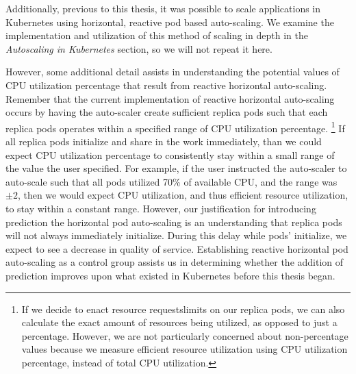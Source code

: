 Additionally, previous to this thesis, it was possible to scale applications in
Kubernetes using horizontal, reactive pod based auto-scaling. We examine the implementation
and utilization of this method of scaling in depth in the \textit{Autoscaling in
Kubernetes} section, so we will not repeat it here.

However, some additional detail assists in understanding the potential values of
CPU utilization percentage that result from reactive horizontal auto-scaling.
Remember that the current implementation of reactive horizontal auto-scaling
occurs by having the auto-scaler create sufficient replica pods such that each
replica pods operates within a specified range of CPU utilization percentage.
\footnote{If we decide to enact resource requests\/limits on our replica pods, we can also
calculate the exact amount of resources being utilized, as opposed to just a
percentage. However, we are not particularly concerned about non-percentage
values because we measure efficient resource utilization using CPU utilization
percentage, instead of total CPU utilization.} If all replica pods initialize
and share in the work immediately, than we could expect CPU utilization
percentage to consistently stay within a small range of the value the user
specified. For example, if the user instructed the auto-scaler to auto-scale
such that all pods utilized 70\% of available CPU, and the range was $\pm 2$,
then we would expect CPU utilization, and thus efficient resource utilization,
to stay within a constant range.
However, our justification for introducing prediction
the horizontal pod auto-scaling is an understanding that replica pods will not
always immediately initialize. During this delay while pods' initialize, we expect to see
a decrease in quality of service.
Establishing reactive horizontal pod auto-scaling as a control group
assists us in determining whether the addition of prediction improves upon what
existed in Kubernetes before this thesis began.

